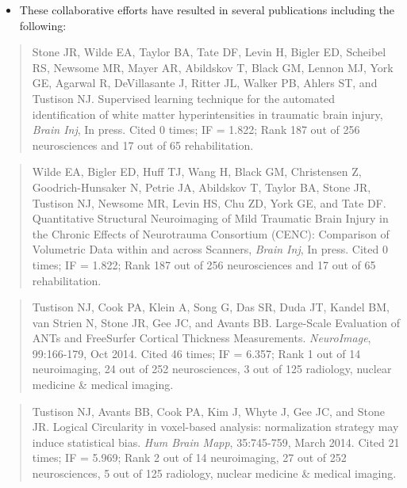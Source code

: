 \documentclass[11pt,]{article}
\providecommand{\tightlist}{%
  \setlength{\itemsep}{0pt}\setlength{\parskip}{0pt}}
\begin{document}
\begin{itemize}
  \begin{itemize}
  \tightlist
  \item
    These collaborative efforts have resulted in several publications
    including the following:
  \end{itemize}

  \begin{quote}
  Stone JR, Wilde EA, Taylor BA, Tate DF, Levin H, Bigler ED, Scheibel
  RS, Newsome MR, Mayer AR, Abildskov T, Black GM, Lennon MJ, York GE,
  Agarwal R, DeVillasante J, Ritter JL, Walker PB, Ahlers ST, and
  Tustison NJ. Supervised learning technique for the automated
  identification of white matter hyperintensities in traumatic brain
  injury, \emph{Brain Inj}, In press. Cited 0 times; IF = 1.822; Rank
  187 out of 256 neurosciences and 17 out of 65 rehabilitation.
  \end{quote}

  \begin{quote}
  Wilde EA, Bigler ED, Huff TJ, Wang H, Black GM, Christensen Z,
  Goodrich-Hunsaker N, Petrie JA, Abildskov T, Taylor BA, Stone JR,
  Tustison NJ, Newsome MR, Levin HS, Chu ZD, York GE, and Tate DF.
  Quantitative Structural Neuroimaging of Mild Traumatic Brain Injury in
  the Chronic Effects of Neurotrauma Consortium (CENC): Comparison of
  Volumetric Data within and across Scanners, \emph{Brain Inj}, In
  press. Cited 0 times; IF = 1.822; Rank 187 out of 256 neurosciences
  and 17 out of 65 rehabilitation.
  \end{quote}

  \begin{quote}
  Tustison NJ, Cook PA, Klein A, Song G, Das SR, Duda JT, Kandel BM, van
  Strien N, Stone JR, Gee JC, and Avants BB. Large-Scale Evaluation of
  ANTs and FreeSurfer Cortical Thickness Measurements.
  \emph{NeuroImage}, 99:166-179, Oct 2014. Cited 46 times; IF = 6.357;
  Rank 1 out of 14 neuroimaging, 24 out of 252 neurosciences, 3 out of
  125 radiology, nuclear medicine \& medical imaging.
  \end{quote}

  \begin{quote}
  Tustison NJ, Avants BB, Cook PA, Kim J, Whyte J, Gee JC, and Stone JR.
  Logical Circularity in voxel-based analysis: normalization strategy
  may induce statistical bias. \emph{Hum Brain Mapp}, 35:745-759, March
  2014. Cited 21 times; IF = 5.969; Rank 2 out of 14 neuroimaging, 27
  out of 252 neurosciences, 5 out of 125 radiology, nuclear medicine \&
  medical imaging.
  \end{quote}


\end{itemize}
\end{document}

